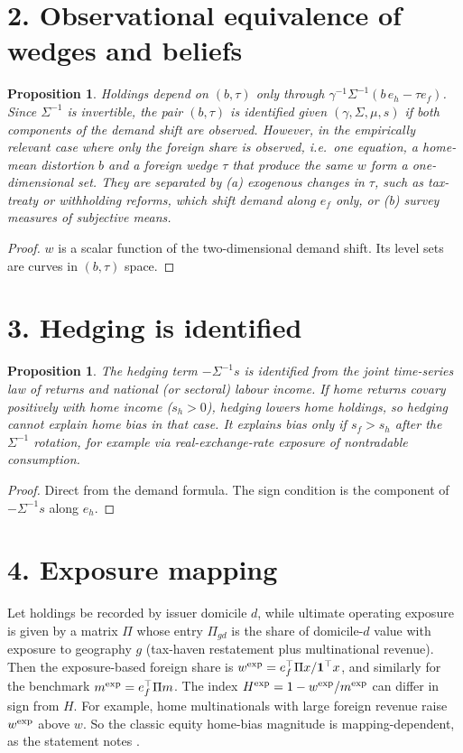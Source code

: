 \documentclass[11pt]{article}
\newtheorem{proposition}[theorem]{Proposition}
\theoremstyle{definition}
\begin{document}
\section*{2. Observational equivalence of wedges and beliefs}
\begin{proposition}\label{prop:oe}
Holdings depend on $(b,\tau)$ only through $\gamma^{-1}\Sigma^{-1}(b\,e_h-\tau e_f)$. Since $\Sigma^{-1}$ is invertible, the
pair $(b,\tau)$ is identified given $(\gamma,\Sigma,\mu,s)$ if both components of the demand shift are observed. However,
in the empirically relevant case where only the \emph{foreign share} is observed, i.e.\ one equation, a home-mean
distortion $b$ and a foreign wedge $\tau$ that produce the same $w$ form a one-dimensional set. They are separated by (a)
exogenous changes in $\tau$, such as tax-treaty or withholding reforms, which shift demand along $e_f$ only, or (b) survey
measures of subjective means.
\end{proposition}
\begin{proof}
$w$ is a scalar function of the two-dimensional demand shift. Its level sets are curves in $(b,\tau)$ space.
\end{proof}

\section*{3. Hedging is identified}
\begin{proposition}\label{prop:hedge}
The hedging term $-\Sigma^{-1}s$ is identified from the joint time-series law of returns and national (or sectoral) labour
income. If home returns covary positively with home income ($s_h>0$), hedging \emph{lowers} home holdings, so hedging
cannot explain home bias in that case. It explains bias only if $s_f>s_h$ after the $\Sigma^{-1}$ rotation, for example via
real-exchange-rate exposure of nontradable consumption.
\end{proposition}
\begin{proof}
Direct from the demand formula. The sign condition is the component of $-\Sigma^{-1}s$ along $e_h$.
\end{proof}

\section*{4. Exposure mapping}
Let holdings be recorded by issuer domicile $d$, while ultimate operating exposure is given by a matrix $\Pi$ whose
entry $\Pi_{gd}$ is the share of domicile-$d$ value with exposure to geography $g$ (tax-haven restatement plus multinational
revenue). Then the exposure-based foreign share is $w^{\rm exp}=e_f^\top\Pi x/\mathbf 1^\top x$, and similarly for the
benchmark $m^{\rm exp}=e_f^\top\Pi m$. The index $H^{\rm exp}=1-w^{\rm exp}/m^{\rm exp}$ can differ in sign from $H$. For
example, home multinationals with large foreign revenue raise $w^{\rm exp}$ above $w$. So the classic equity home-bias
magnitude is mapping-dependent, as the statement notes \cite{fp}.
\end{document}
